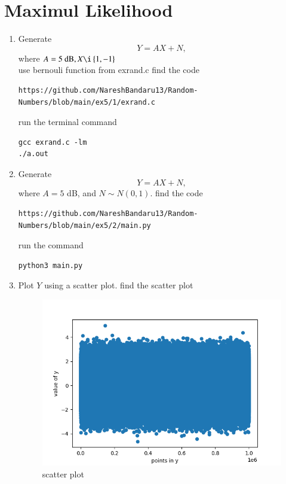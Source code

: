 \documentclass[journal,12pt,twocolumn]{IEEEtran}
\renewcommand\thesection{\arabic{section}}
\begin{document}
\section{Maximul Likelihood}
\begin{enumerate}[label=\thesection.\arabic*
,ref=\thesection.\theenumi]

\item Generate 
\begin{equation}
Y = AX+N,
\end{equation}
where $A = 5 \text{ dB}, X \i \cbrak{1,-1}$\\
\solution
use bernouli function from exrand.c find the code
\begin{lstlisting}
https://github.com/NareshBandaru13/Random-Numbers/blob/main/ex5/1/exrand.c
\end{lstlisting}
run the terminal command
\begin{lstlisting}
gcc exrand.c -lm
./a.out
\end{lstlisting}


\item Generate 
\begin{equation}
Y = AX+N,
\end{equation}
where $A = 5$ dB,  and $N \sim N(0,1)$.
find the code
\begin{lstlisting}
https://github.com/NareshBandaru13/Random-Numbers/blob/main/ex5/2/main.py
\end{lstlisting}
run the command
\begin{lstlisting}
python3 main.py
\end{lstlisting}

\item Plot $Y$ using a scatter plot.
find the scatter plot\\
\solution
\begin{figure}[H]
    \includegraphics[scale = 0.6]{y.png}
    \caption{scatter plot}
    \label{fig:my_y}
\end{figure}


\end{enumerate}
\end{document}
